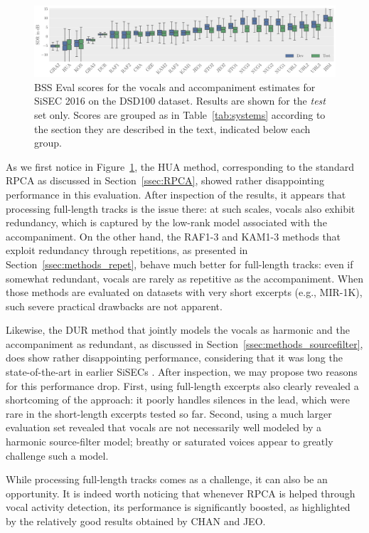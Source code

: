 \begin{figure}[htbp]
	\includegraphics[width=\textwidth]{gfx/vocalsSDR.pdf}
	\caption{BSS Eval scores for the vocals and accompaniment estimates for SiSEC 2016 on the DSD100 dataset. Results are  shown for the \emph{test} set only. Scores are grouped as in Table~\ref{tab:systems} according to the section they are described in the text, indicated below each group.}
	\label{fig:eval}
\end{figure}

As we first notice in Figure~\ref{fig:eval}, the HUA method, corresponding to the standard RPCA as discussed in Section~\ref{ssec:RPCA}, showed rather disappointing performance in this evaluation. After inspection of the results, it appears that processing full-length tracks is the issue there: at such scales, vocals also exhibit redundancy, which is captured by the low-rank model associated with the accompaniment. On the other hand, the RAF1-3 and KAM1-3 methods that exploit redundancy through repetitions, as presented in Section~\ref{ssec:methods_repet}, behave much better for full-length tracks: even if somewhat redundant, vocals are rarely as repetitive as the accompaniment. When those methods are evaluated on datasets with very short excerpts (e.g., MIR-1K), such severe practical drawbacks are not apparent.

Likewise, the DUR method that jointly models the vocals as harmonic and the accompaniment as redundant, as discussed in Section~\ref{ssec:methods_sourcefilter}, does show rather disappointing performance, considering that it was long the state-of-the-art in earlier SiSECs \cite{vincent12}. After inspection, we may propose two reasons for this performance drop. First, using full-length excerpts also clearly revealed a shortcoming of the approach: it poorly handles silences in the lead, which were rare in the short-length excerpts tested so far. Second, using a much larger evaluation set revealed that vocals are not necessarily well modeled by a harmonic source-filter model; breathy or saturated voices appear to greatly challenge such a model.

While processing full-length tracks comes as a challenge, it can also be an opportunity. It is indeed worth noticing that whenever RPCA is helped through vocal activity detection, its performance is significantly boosted, as highlighted by the relatively good results obtained by CHAN and JEO.

